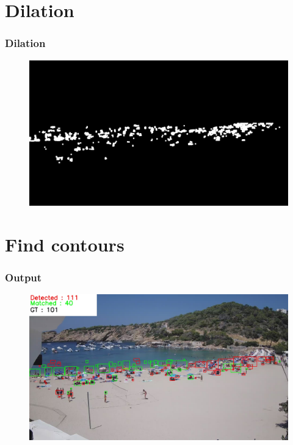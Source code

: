 \documentclass{beamer}
\begin{document}
\section{Dilation}
\begin{frame}
    \frametitle{Dilation}

    \begin{figure}
        \centering
        \includegraphics[width=\textwidth]{../gen/dil/1660305600.jpg}
    \end{figure}

    
\end{frame}

\section{Find contours}
\begin{frame}
    \frametitle{Output}
    \begin{figure}
        \centering
        \includegraphics[width=\textwidth]{../gen/det/1660305600.jpg}
    \end{figure}
\end{frame}
\end{document}

